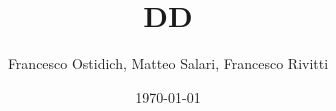 
\title{\Huge DD}
\author{Francesco Ostidich, Matteo Salari, Francesco Rivitti}
\date{\today}
\maketitle
\vspace{12mm}
\tableofcontents
\newpage

